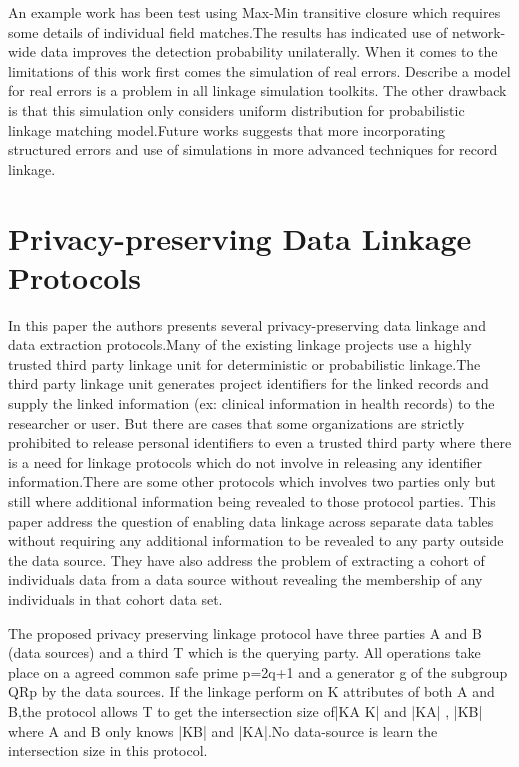\documentclass[a4paper]{article}
\begin{document}
An example work has been test using Max-Min transitive closure which requires some details of individual field matches.The results has indicated use of network-wide data improves the detection probability unilaterally. When it comes to the limitations of this work first comes the simulation of real errors. Describe a model for real errors is a problem in all linkage simulation toolkits. The other drawback is that this simulation only considers uniform distribution for probabilistic linkage matching model.Future works suggests that more incorporating structured errors and use of simulations in more advanced techniques for record linkage. 

\section*{Privacy-preserving Data Linkage Protocols} 
In this paper \cite{Keefe2004}  the authors presents several privacy-preserving data linkage and data extraction protocols.Many of the existing linkage projects use a highly trusted third party linkage unit for deterministic or probabilistic linkage.The third party linkage unit generates project identifiers for the linked records and supply the linked information (ex: clinical information in health records) to the researcher or user. But there are cases that some organizations are strictly prohibited to release personal identifiers to even a trusted third party where there is a need for linkage protocols which do not involve in releasing any identifier information.There are some other protocols which involves two parties only but still where additional information being revealed to those protocol parties. This paper address the question of enabling data linkage across separate data tables without requiring any additional information to be revealed to any party outside the data source. They have also address the problem of extracting a cohort of individuals data from a data source without revealing the membership of any individuals in that cohort data set.

The proposed privacy preserving linkage protocol have three parties A and B (data sources)
and a third T which is the querying party.
All operations take place on a agreed common safe prime p=2q+1 and a generator g of the subgroup QRp by the data sources. If the linkage perform on K attributes of both A and B,the protocol allows T to get the intersection size of|KA  K| and |KA| , |KB| where A and B only knows |KB| and |KA|.No data-source is learn the intersection size in this protocol.
\end{document}

